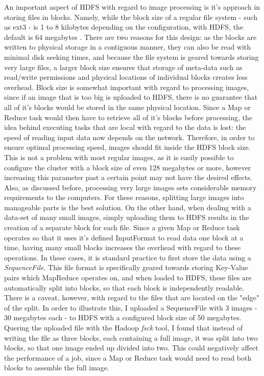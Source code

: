 \documentclass [12pt,a4paper]{report}
\begin{document}
An important aspect of HDFS with regard to image processing is it's approach in storing files in blocks. Namely, while the block size of a regular file system - such as ext3 - is 1 to 8 kilobytes depending on the configuration, with HDFS, the default is 64 megabytes \cite{ext3}. There are two reasons for this design: as the blocks are written to physical storage in a contiguous manner, they can also be read with minimal disk seeking times, and because the file system is geared towards storing very large files, a larger block size ensures that storage of meta-data such as read/write permissions and physical locations of individual blocks creates less overhead. 
Block size is somewhat important with regard to processing images, since if an image that is too big is uploaded to HDFS, there is no guarantee that all of it's blocks would be stored in the same physical location. Since a Map or Reduce task would then have to retrieve all of it's blocks before processing, the idea behind executing tasks that are local with regard to the data is lost: the speed of reading input data now depends on the network. Therefore, in order to ensure optimal processing speed, images should fit inside the HDFS block size. This is not a problem with most regular images, as it is easily possible to configure the cluster with a block size of even 128 megabytes or more, however increasing this parameter past a certain point may not have the desired effects. Also, as discussed before, processing very large images sets considerable memory requirements to the computers. For these reasons, splitting large images into manageable parts is the best solution.
On the other hand, when dealing with a data-set of many small images, simply uploading them to HDFS results in the creation of a separate block for each file. Since a given Map or Reduce task operates so that it uses it's defined InputFormat to read data one block at a time, having many small blocks increases the overhead with regard to these operations. In these cases, it is standard practice to first store the data using a \textit{SequenceFile}. This file format is specifically geared towards storing Key-Value pairs which MapReduce operates on, and when loaded to HDFS, these files are automatically split into blocks, so that each block is independently readable. There is a caveat, however, with regard to the files that are located on the "edge" of the split. In order to illustrate this, I uploaded a SequenceFile with 3 images - 30 megabytes each - to HDFS with a configured block size of 50 megabytes. Quering the uploaded file with the Hadoop \textit{fsck} tool, I found that instead of writing the file as three blocks, each containing a full image, it was split into two blocks, so that one image ended up divided into two. This could negatively affect the performance of a job, since a Map or Reduce task would need to read both blocks to assemble the full image.
\end{document}
